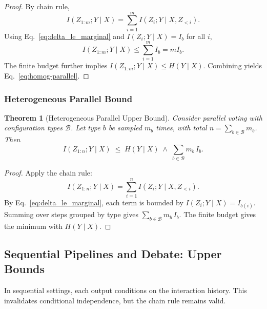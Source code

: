 \documentclass{article}
\theoremstyle{plain}
\newtheorem{theorem}{Theorem}[section]
\theoremstyle{definition}
\theoremstyle{remark}
\begin{document}
\begin{proof}
By chain rule,
\begin{equation}
I(Z_{1:m};Y\mid X)
=\sum_{i=1}^m I(Z_i;Y\mid X,Z_{<i}).
\end{equation}
Using Eq.~\eqref{eq:delta_le_marginal} and $I(Z_i;Y\mid X)=I_b$ for all $i$,
\begin{equation}
I(Z_{1:m};Y\mid X)\le \sum_{i=1}^m I_b = mI_b.
\end{equation}
The finite budget further implies $I(Z_{1:m};Y\mid X)\le H(Y\mid X)$.
Combining yields Eq.~\eqref{eq:homog-parallel}.
\end{proof}

\subsubsection{Heterogeneous Parallel Bound}
\label{app:heterog-parallel}

\begin{theorem}[Heterogeneous Parallel Upper Bound]
\label{thm:heterog-parallel}
Consider parallel voting with configuration types $\mathcal{B}$.
Let type $b$ be sampled $m_b$ times, with total $n=\sum_{b\in\mathcal{B}} m_b$.
Then
\begin{equation}
I(Z_{1:n};Y\mid X)
\;\le\;
H(Y\mid X) \;\wedge\; \sum_{b\in\mathcal{B}} m_b\, I_b.
\label{eq:heterog-parallel}
\end{equation}
\end{theorem}

\begin{proof}
Apply the chain rule:
\begin{equation}
I(Z_{1:n};Y\mid X)=\sum_{i=1}^n I(Z_i;Y\mid X,Z_{<i}).
\end{equation}
By Eq.~\eqref{eq:delta_le_marginal}, each term is bounded by $I(Z_i;Y\mid X)=I_{b(i)}$.
Summing over steps grouped by type gives $\sum_{b\in\mathcal{B}} m_b\, I_b$.
The finite budget gives the minimum with $H(Y\mid X)$.
\end{proof}

\subsection{Sequential Pipelines and Debate: Upper Bounds}
\label{app:sequential}

In sequential settings, each output conditions on the interaction history.
This invalidates conditional independence, but the chain rule remains valid.
\end{document}
